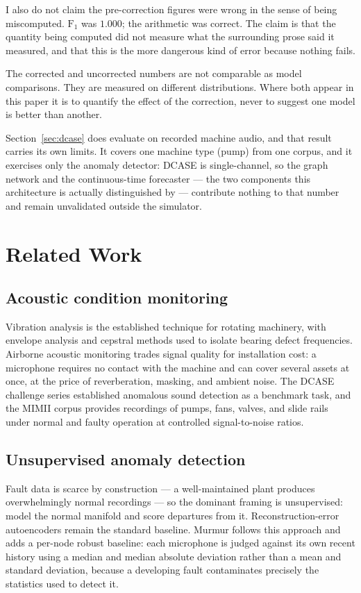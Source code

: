 \documentclass[11pt]{article}
\let\oldsection\section
\renewcommand{\section}{\clearpage\oldsection}
\begin{document}
I also do not claim the pre-correction figures were wrong in the sense of being
miscomputed. $\mathrm{F}_1$ was $1.000$; the arithmetic was correct. The claim is
that the quantity being computed did not measure what the surrounding prose said
it measured, and that this is the more dangerous kind of error because nothing
fails.

The corrected and uncorrected numbers are not comparable as model comparisons.
They are measured on different distributions. Where both appear in this paper it
is to quantify the effect of the correction, never to suggest one model is
better than another.

Section~\ref{sec:dcase} does evaluate on recorded machine audio, and that result
carries its own limits. It covers one machine type (pump) from one corpus, and
it exercises only the anomaly detector: DCASE is single-channel, so the graph
network and the continuous-time forecaster --- the two components this
architecture is actually distinguished by --- contribute nothing to that number
and remain unvalidated outside the simulator.

\section{Related Work}

\subsection{Acoustic condition monitoring}
Vibration analysis is the established technique for rotating machinery, with
envelope analysis and cepstral methods used to isolate bearing defect
frequencies. Airborne acoustic monitoring trades signal quality for
installation cost: a microphone requires no contact with the machine and can
cover several assets at once, at the price of reverberation, masking, and
ambient noise. The DCASE challenge series established anomalous sound detection
as a benchmark task, and the MIMII corpus provides recordings of pumps, fans,
valves, and slide rails under normal and faulty operation at controlled
signal-to-noise ratios.

\subsection{Unsupervised anomaly detection}
Fault data is scarce by construction --- a well-maintained plant produces
overwhelmingly normal recordings --- so the dominant framing is unsupervised:
model the normal manifold and score departures from it. Reconstruction-error
autoencoders remain the standard baseline. Murmur follows this approach and adds
a per-node robust baseline: each microphone is judged against its own recent
history using a median and median absolute deviation rather than a mean and
standard deviation, because a developing fault contaminates precisely the
statistics used to detect it.
\end{document}
